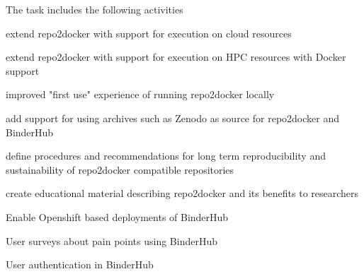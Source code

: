 \begin{task}[
  title=repo2docker development,
  id=repo2docker-timemachine,
  lead=SRL,
  PM=38,
  wphases={0-36!1.055},
  partners={QS,MP}
]
  The task includes the following activities
  \begin{compactitem}
  \item extend repo2docker with support for execution on cloud resources
  \item extend repo2docker with support for execution on HPC resources with Docker support
  \item improved "first use" experience of running repo2docker locally
  \item add support for using archives such as Zenodo as source for repo2docker and BinderHub
  \item define procedures and recommendations for long term reproducibility and sustainability of repo2docker compatible repositories
  \item create educational material describing repo2docker and its benefits to researchers
  \item Enable Openshift based deployments of BinderHub
  \item User surveys about pain points using BinderHub
  \item User authentication in BinderHub
  \end{compactitem}
\end{task}
